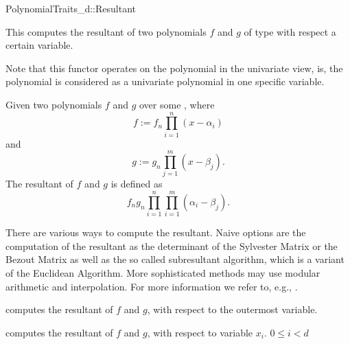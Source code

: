 \begin{ccRefConcept}{PolynomialTraits_d::Resultant}
\ccDefinition

This  computes the resultant of two polynomials 
$f$ and $g$ of type  with respect a 
certain variable.
 
Note that this functor operates on the polynomial in the univariate view, 
\that is, the polynomial is considered as a univariate polynomial in one 
specific variable. 

Given two polynomials $f$ and $g$ over some , where 
\[f := f_n \prod_{i=1}^{n}{(x-\alpha_i)}\] 
and 
\[g :=  g_n \prod_{j=1}^{m}{(x-\beta_j)}.\] 
The resultant of $f$ and $g$ is defined as 
\[f_n g_n \prod_{i=1}^{n}\prod_{i=1}^{m}{(\alpha_i-\beta_j)}.\] 

There are various ways to compute the resultant. 
Naive options are the computation of the 
resultant as the determinant of the Sylvester Matrix or the Bezout 
Matrix as well as the so called subresultant algorithm, 
which is a variant of the Euclidean Algorithm. 
More sophisticated methods may use modular arithmetic and interpolation. 
For more information we refer to, e.g., \cite{gg-mca-99}. 




\ccRefines 
{}

\ccTypes
{}
\ccGlue
{}
\ccGlue
{}

\ccOperations
{}
         { computes the resultant of $f$ and $g$, 
           with respect to the outermost variable.}

         { computes the resultant of $f$ and $g$,
           with respect to variable $x_i$. 
           \ccPrecond $0 \leq i  < d$ 
         }


\ccSeeAlso

\\
\\

\end{ccRefConcept}
